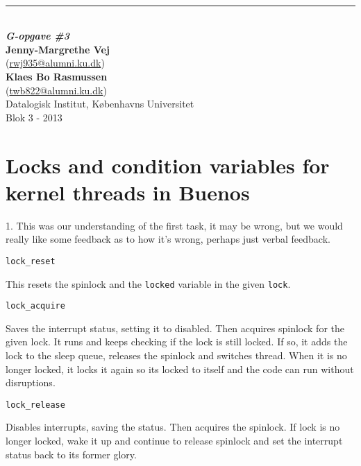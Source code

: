 \thispagestyle{empty}
\begin{flushright}
   {\Huge\textbf{\@title}}\\[3mm]
   \rule{\linewidth}{2mm}\\[3mm]
   {\Large\textbf{\textit{G-opgave \#3}}}\\
   \vspace{12cm}
   {\normalsize \textbf{Jenny-Margrethe Vej}
   \\(\url{rwj935@alumni.ku.dk})}
   \\
   {\normalsize \textbf{Klaes Bo Rasmussen}
   \\(\url{twb822@alumni.ku.dk})}
   \\
	\vspace*{2cm}
   {\normalsize Datalogisk Institut, Københavns Universitet}\\
   {\normalsize Blok 3 - 2013}\\
\end{flushright}
\clearpage


\section{Locks and condition variables for kernel threads in Buenos}
1. This was our understanding of the first task, it may be wrong, but we
would really like some feedback as to how it's wrong, perhaps just
verbal feedback.

\vspace{1pc}

\verb+lock_reset+ 

This resets the spinlock and the \verb+locked+ variable in the given
\verb+lock+.

\vspace{0.5pc}

\verb+lock_acquire+

Saves the interrupt status, setting it to disabled. Then acquires
spinlock for the given lock. It runs and keeps checking if the lock is
still locked. If so, it adds the lock to the sleep queue, releases the
spinlock and switches thread. When it is no longer locked, it locks it
again so its locked to itself and the code can run without
disruptions.

\vspace{0.5pc}

\verb+lock_release+

Disables interrupts, saving the status. Then acquires the spinlock. If
lock is no longer locked, wake it up and continue to release spinlock
and set the interrupt status back to its former glory.

